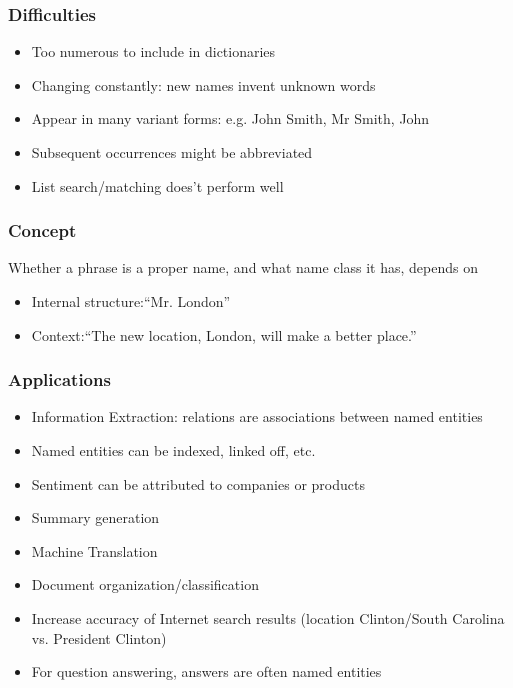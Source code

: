 \begin{frame}[fragile]\frametitle{Difficulties}
  \begin{itemize}
  \item Too numerous to include in dictionaries
  \item Changing constantly: new names invent unknown words
  \item Appear in many variant forms: e.g. John Smith, Mr Smith, John
  \item Subsequent occurrences might be abbreviated
  \item List search/matching does't perform well
  \end{itemize}
\end{frame}

\begin{frame}[fragile]\frametitle{Concept}
Whether a phrase is a proper name, and what name class it has, depends on

  \begin{itemize}
  \item Internal structure:``Mr. London'' 
  \item Context:``The new location, London, will make a better place.''
  \end{itemize}
\end{frame}

\begin{frame}[fragile]\frametitle{Applications}
  \begin{itemize}
  \item Information Extraction:  relations are associations between named entities
  \item Named entities can be indexed, linked off, etc.
  \item Sentiment can be attributed to companies or products
  \item Summary generation
  \item Machine Translation
  \item Document organization/classification
  \item Increase accuracy of Internet search results (location Clinton/South Carolina vs. President Clinton)
  \item For question answering, answers are often named entities
  \end{itemize}
\end{frame}

